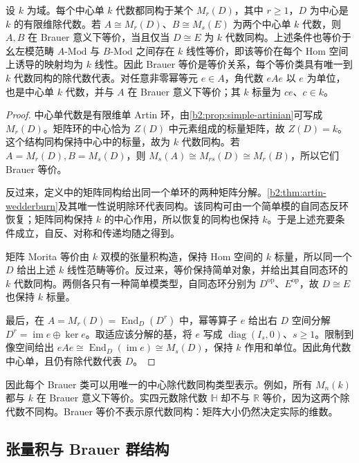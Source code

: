 \begin{proposition}\label{b2:prop:brauer-division-representative}
	设 \(k\) 为域。每个中心单 \(k\) 代数都同构于某个 \(M_r(D)\)，其中 \(r\geq1\)，\(D\) 为中心是 \(k\) 的有限维除代数。若 \(A\cong M_r(D)\)、\(B\cong M_s(E)\) 为两个中心单 \(k\) 代数，则 \(A,B\) 在 Brauer 意义下等价，当且仅当 \(D\cong E\) 为 \(k\) 代数同构。上述条件也等价于幺左模范畴 \(A\text{-Mod}\) 与 \(B\text{-Mod}\) 之间存在 \(k\) 线性等价，即该等价在每个 Hom 空间上诱导的映射均为 \(k\) 线性。因此 Brauer 等价是等价关系，每个等价类具有唯一到 \(k\) 代数同构的除代数代表。对任意非零幂等元 \(e\in A\)，角代数 \(eAe\) 以 \(e\) 为单位，也是中心单 \(k\) 代数，并与 \(A\) 在 Brauer 意义下等价；其 \(k\) 标量为 \(ce\)、\(c\in k\)。
\end{proposition}
\begin{proof}
	中心单代数是有限维单 Artin 环，由\cref{b2:prop:simple-artinian}可写成 \(M_r(D)\)。矩阵环的中心恰为 \(Z(D)\) 中元素组成的标量矩阵，故 \(Z(D)=k\)。这个结构同构保持中心中的标量，故为 \(k\) 代数同构。若 \(A=M_r(D),B=M_s(D)\)，则 \(M_s(A)\cong M_{rs}(D)\cong M_r(B)\)，所以它们 Brauer 等价。

	反过来，定义中的矩阵同构给出同一个单环的两种矩阵分解。\cref{b2:thm:artin-wedderburn}及其唯一性说明除环代表同构。该同构可由一个简单模的自同态反环恢复；矩阵同构保持 \(k\) 的中心作用，所以恢复的同构也保持 \(k\)。于是上述充要条件成立，自反、对称和传递均随之得到。

	矩阵 Morita 等价由 \(k\) 双模的张量积构造，保持 Hom 空间的 \(k\) 标量，所以同一个 \(D\) 给出上述 \(k\) 线性范畴等价。反过来，等价保持简单对象，并给出其自同态环的 \(k\) 代数同构。两侧各只有一种简单模类型，自同态环分别为 \(D^{\mathrm{op}}\)、\(E^{\mathrm{op}}\)，故 \(D\cong E\) 也保持 \(k\) 标量。

	最后，在 \(A=M_r(D)=\operatorname{End}_D(D^r)\) 中，幂等算子 \(e\) 给出右 \(D\) 空间分解 \(D^r=\operatorname{im}e\oplus\ker e\)。取适应该分解的基，将 \(e\) 写成 \(\operatorname{diag}(I_s,0)\)、\(s\ge1\)。限制到像空间给出 \(eAe\cong\operatorname{End}_D(\operatorname{im}e)\cong M_s(D)\)，保持 \(k\) 作用和单位。因此角代数中心单，且仍有除代数代表 \(D\)。
\end{proof}

因此每个 Brauer 类可以用唯一的中心除代数同构类型表示。例如，所有 \(M_n(k)\) 都与 \(k\) 在 Brauer 意义下等价。实四元数除代数 \(\mathbb H\) 却不与 \(\mathbb R\) 等价，因为这两个除代数不同构。Brauer 等价不表示原代数同构：矩阵大小仍然决定实际的维数。

\subsection{张量积与 Brauer 群结构}
\label{b2:subsec:1801:02}

